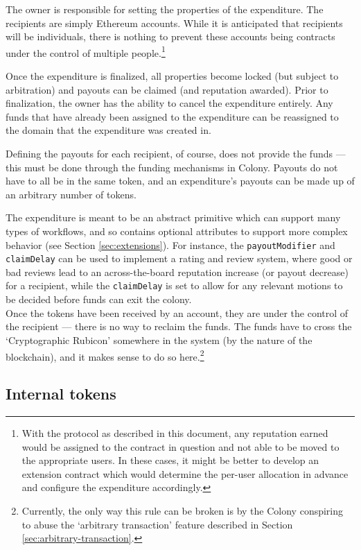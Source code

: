 The owner is responsible for setting the properties of the expenditure. The recipients are simply Ethereum accounts. While it is anticipated that recipients will be individuals, there is nothing to prevent these accounts being contracts under the control of multiple people.\footnote{With the protocol as described in this document, any reputation earned would be assigned to the contract in question and not able to be moved to the appropriate users. In these cases, it might be better to develop an extension contract which would determine the per-user allocation in advance and configure the expenditure accordingly.}

Once the expenditure is finalized, all properties become locked (but subject to arbitration) and payouts can be claimed (and reputation awarded). Prior to finalization, the owner has the ability to cancel the expenditure entirely. Any funds that have already been assigned to the expenditure can be reassigned to the domain that the expenditure was created in.

Defining the payouts for each recipient, of course, does not provide the funds --- this must be done through the funding mechanisms in Colony. Payouts do not have to all be in the same token, and an expenditure's payouts can be made up of an arbitrary number of tokens.

The expenditure is meant to be an abstract primitive which can support many types of workflows, and so contains optional attributes to support more complex behavior (see Section \ref{sec:extensions}). For instance, the \texttt{payoutModifier} and \texttt{claimDelay} can be used to implement a rating and review system, where good or bad reviews lead to an across-the-board reputation increase (or payout decrease) for a recipient, while the \texttt{claimDelay} is set to allow for any relevant motions to be decided before funds can exit the colony. \\

Once the tokens have been received by an account, they are under the control of the recipient --- there is no way to reclaim the funds. The funds have to cross the `Cryptographic Rubicon' somewhere in the system (by the nature of the blockchain), and it makes sense to do so here.\footnote{Currently, the only way this rule can be broken is by the Colony conspiring to abuse the `arbitrary transaction' feature described in Section \ref{sec:arbitrary-transaction}.}

\subsection{Internal tokens}\label{sec:colony-tokens}

